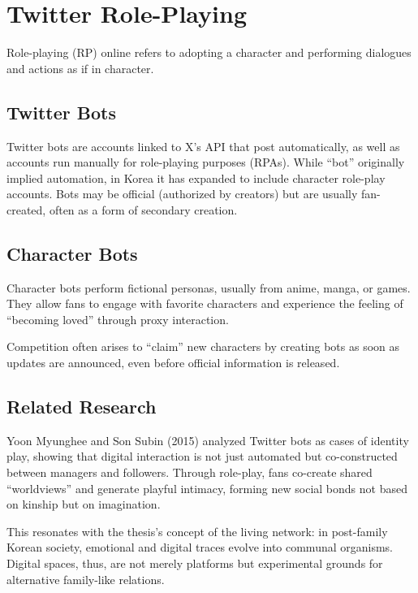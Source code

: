 \section{Twitter Role-Playing}
Role-playing (RP) online refers to adopting a character and performing dialogues and actions as if in character.  

\subsection{Twitter Bots}
Twitter bots are accounts linked to X’s API that post automatically, as well as accounts run manually for role-playing purposes (RPAs). While “bot” originally implied automation, in Korea it has expanded to include character role-play accounts. Bots may be official (authorized by creators) but are usually fan-created, often as a form of secondary creation.  

\subsection{Character Bots}
Character bots perform fictional personas, usually from anime, manga, or games. They allow fans to engage with favorite characters and experience the feeling of “becoming loved” through proxy interaction.  

Competition often arises to “claim” new characters by creating bots as soon as updates are announced, even before official information is released.  

\subsection{Related Research}
Yoon Myunghee and Son Subin (2015) analyzed Twitter bots as cases of identity play, showing that digital interaction is not just automated but co-constructed between managers and followers. Through role-play, fans co-create shared “worldviews” and generate playful intimacy, forming new social bonds not based on kinship but on imagination.  

This resonates with the thesis’s concept of the living network: in post-family Korean society, emotional and digital traces evolve into communal organisms. Digital spaces, thus, are not merely platforms but experimental grounds for alternative family-like relations.




